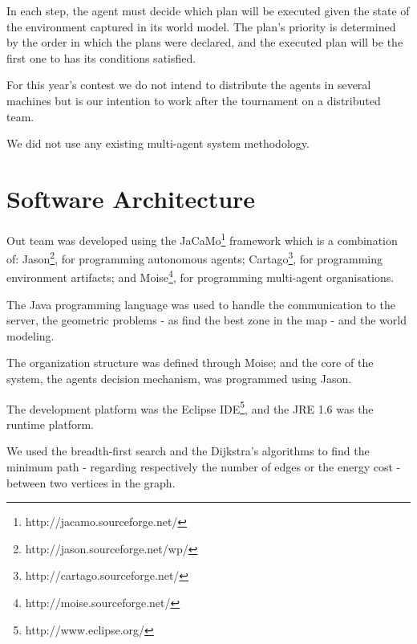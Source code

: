 \documentclass{llncs}
\begin{document}
In each step, the agent must decide which plan will be executed given the state of the environment
captured in its world model. The plan's priority is determined by the order in which the plans were
declared, and the executed plan will be the first one to has its conditions satisfied.

For this year's contest we do not intend to distribute the agents in several machines but
is our intention to work after the tournament on a distributed team.

We did not use any existing multi-agent system methodology.


\section*{Software Architecture}

Out team was developed using the JaCaMo\footnote[2]{http://jacamo.sourceforge.net/}
framework which is a combination of: Jason\footnote[3]{http://jason.sourceforge.net/wp/},
for programming autonomous agents; Cartago\footnote[4]{http://cartago.sourceforge.net/}, for
programming environment artifacts; and Moise\footnote[5]{http://moise.sourceforge.net/}, for
programming multi-agent organisations.
 
The Java programming language was used to handle the communication to the server, the geometric
problems - as find the best zone in the map - and the world modeling.

The organization structure was defined through Moise; and the core of the system, the agents
decision mechanism, was programmed using Jason.

The development platform was the Eclipse IDE\footnote[6]{http://www.eclipse.org/}, and the JRE 1.6
was the runtime platform.

We used the breadth-first search and the Dijkstra's algorithms to find the minimum path - regarding
respectively the number of edges or the energy cost - between two vertices in the graph.
\end{document}
